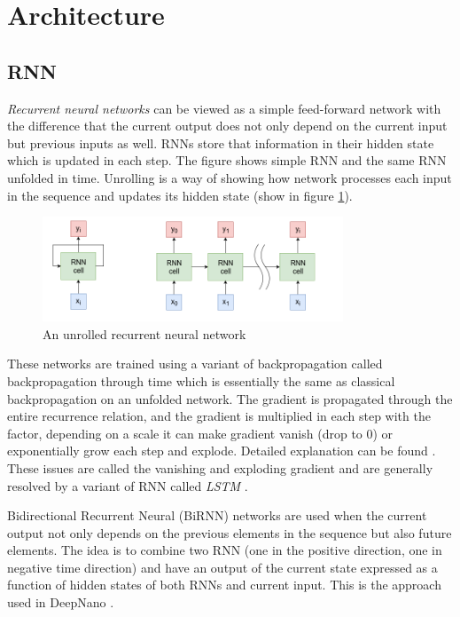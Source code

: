 \documentclass[times, utf8, diplomski, numeric, english]{fer}
\begin{document}
\section{Architecture}

\subsection{RNN}
\textit{Recurrent neural networks} can be viewed as a simple feed-forward network with the difference that the current output does not only depend on the current input but previous inputs as well. RNNs store that information in their hidden state which is updated in each step. The figure shows simple RNN and the same RNN unfolded in time.  Unrolling is a way of showing how network processes each input in the sequence and updates its hidden state (show in figure  \ref{fg:rnn}).
\begin{figure}[!ht]
	\begin{center}
		\includegraphics[width=0.8\textwidth]{./imgs/rnn.png}
		\caption{An unrolled recurrent neural network}
		\label{fg:rnn}
	\end{center}
\end{figure}

These networks are trained using a variant of backpropagation called backpropagation through time which is essentially the same as classical backpropagation on an unfolded network. The gradient is propagated through the entire recurrence relation, and the gradient is multiplied in each step with the factor, depending on a scale it can make gradient vanish (drop to 0) or exponentially grow each step and explode. Detailed explanation can be found \cite{rnn-blog}. These issues are called the vanishing and exploding gradient and are generally resolved by a variant of RNN called \textit{LSTM} \cite{hochreiter1997long}. 

Bidirectional Recurrent Neural (BiRNN) networks are used when the current output not only depends on the previous elements in the sequence but also future elements. The idea is to combine two RNN (one in the positive direction, one in negative time direction) and have an output of the current state expressed as a function of hidden states of both RNNs and current input. This is the approach used in DeepNano \cite{Boza2017}. 
\end{document}
